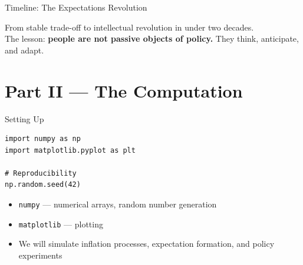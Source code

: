 \documentclass[aspectratio=169, 10pt]{beamer}
\begin{document}
\begin{frame}{Timeline: The Expectations Revolution}
\begin{center}
\end{center}
\vspace{0.5em}
From stable trade-off to intellectual revolution in under two decades.\\[4pt]
The lesson: \textbf{people are not passive objects of policy.}
They think, anticipate, and adapt.
\end{frame}

\section{Part II --- The Computation}

\begin{frame}[fragile]{Setting Up}
\begin{lstlisting}
import numpy as np
import matplotlib.pyplot as plt

# Reproducibility
np.random.seed(42)
\end{lstlisting}
\vspace{0.5em}
\begin{itemize}
  \item \texttt{numpy} --- numerical arrays, random number generation
  \item \texttt{matplotlib} --- plotting
  \item We will simulate inflation processes, expectation formation,
        and policy experiments
\end{itemize}
\end{frame}
\end{document}

